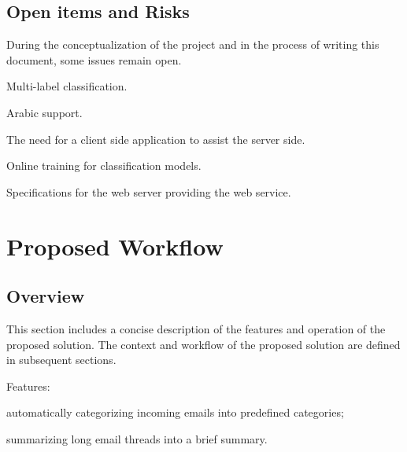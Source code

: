 \subsection{Open items and Risks}
During the conceptualization of the project and in the process of writing this document, 
some issues remain open.
\begin{my_itemize}
  \item Multi-label classification.
  \item Arabic support.
  \item The need for a client side application to assist the server side.
  \item Online training for classification models.
  \item Specifications for the web server providing the web service.
\end{my_itemize}


\newpage
\section{Proposed Workflow}
\subsection{Overview}
This section includes a concise description of the features and operation of the 
proposed solution. The context and workflow of the proposed solution are defined in subsequent sections.

Features:
\begin{my_itemize}
  \item automatically categorizing incoming emails into predefined categories;
  \item summarizing long email threads into a brief summary.
\end{my_itemize}


